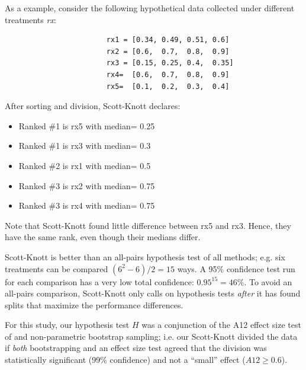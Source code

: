 \documentclass[conference]{IEEEtran}
\newcommand{\bi}{\begin{itemize}}
\newcommand{\ei}{\end{itemize}}
\begin{document}
					As a example, consider the following hypothetical data collected under different treatments {\em rx}:
					
					{\scriptsize \begin{verbatim}
						rx1 = [0.34, 0.49, 0.51, 0.6]
						rx2 = [0.6,  0.7,  0.8,  0.9]
						rx3 = [0.15, 0.25, 0.4,  0.35]
						rx4=  [0.6,  0.7,  0.8,  0.9]
						rx5=  [0.1,  0.2,  0.3,  0.4]
						\end{verbatim}}
					\noindent
					After sorting and division, Scott-Knott declares:
					\bi
					\item Ranked \#1 is rx5 with median= 0.25
					\item Ranked \#1 is rx3 with median= 0.3
					\item Ranked \#2 is rx1 with median= 0.5
					\item Ranked \#3 is rx2 with median= 0.75
					\item Ranked \#3 is rx4 with median= 0.75
					\ei
					Note that Scott-Knott found  little
					difference between rx5 and rx3. Hence,
					they have the same rank, even though their medians differ.
					
					Scott-Knott is better than an 
					all-pairs hypothesis test of all methods; e.g. six treatments
					can be compared \mbox{$(6^2-6)/2=15$} ways. 
					A 95\% confidence test run for each comparison has  a very low total confidence: 
					\mbox{$0.95^{15} = 46$}\%.
					To avoid an all-pairs comparison, Scott-Knott only calls on hypothesis
					tests {\em after} it has found splits that maximize the performance differences.
					
					For this study, our hypothesis test $H$ was a
					conjunction of the A12 effect size test of  and
					non-parametric bootstrap sampling; i.e. our
					Scott-Knott divided the data if {\em both}
					bootstrapping and an effect size test agreed that
					the division was statistically significant (99\%
					confidence) and not a ``small'' effect ($A12 \ge
					0.6$).
					
\end{document}
